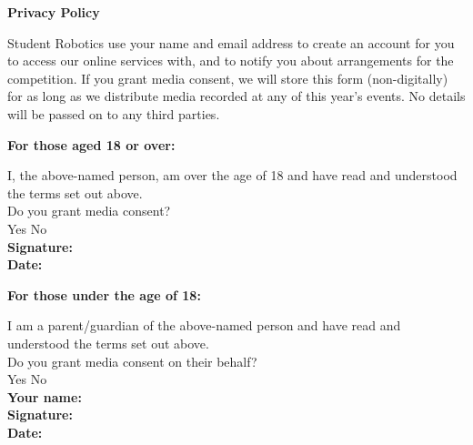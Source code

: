 \documentclass[a4paper,10pt]{article}
\newcommand{\checkbox}[1]{#1\hspace{0.2cm}\raisebox{-0.3mm}{$\square$}}
\newcommand{\textfield}[1]{\textbf{#1:} \hrulefill\hspace{0mm}}
\newcommand{\fieldsep}{\\[2.5mm]}
\begin{document}
\textbf{\large Privacy Policy}\\\vspace{-3mm}

Student Robotics use your name and email address to create an account for you to access our online services with, and to notify you about arrangements for the competition.
If you grant media consent, we will store this form (non-digitally) for as long as we distribute media recorded at any of this year's events.
No details will be passed on to any third parties. \\

\begin{minipage}[t]{0.48\textwidth}
\textbf{For those aged 18 or over:}

I, the above-named person, am over the age of 18 and have read and understood the terms set out above.\\

Do you grant media consent? \\[2mm]
\checkbox{Yes} \hspace{1cm} \checkbox{No}\\

\textfield{Signature} \fieldsep
\textfield{Date}
\end{minipage}
\hspace{0.02\textwidth}
\begin{minipage}[t]{0.48\textwidth}
\textbf{For those under the age of 18:}

I am a parent/guardian of the above-named person and have read and understood the terms set out above.\\

Do you grant media consent on their behalf?\\[2mm]
\checkbox{Yes} \hspace{1cm} \checkbox{No}\\

\textfield{Your name} \fieldsep
\textfield{Signature} \fieldsep
\textfield{Date}
\end{minipage}
\end{document}
